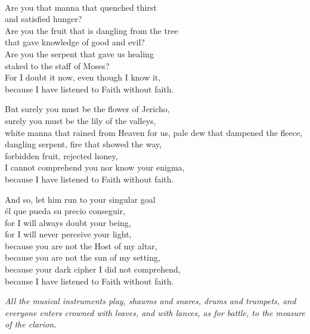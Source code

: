 \begin{poemtranslation}
\begin{translation}
\Dots\\
Are you that manna that quenched thirst\\
and satisfied hunger?\\
Are you the fruit that is dangling from the tree\\
that gave knowledge of good and evil?\\
Are you the serpent that gave us healing\\
staked to the staff of Moses?\\
For I doubt it now, even though I know it,\\
because I have listened to Faith without faith. 

But surely you must be the flower of Jericho,\\
surely you must be the lily of the valleys,\\
white manna that rained from Heaven for us, 
pale dew that dampened the fleece,\\
dangling serpent, fire that showed the way,\\
forbidden fruit, rejected honey,\\
I cannot comprehend you nor know your enigma,\\
because I have listened to Faith without faith. 

And so, let him run to your singular goal\\
él que pueda su precio conseguir,\\
for I will always doubt your being,\\
for I will never perceive your light,\\
because you are not the Host of my altar,\\
because you are not the sun of my setting,\\
because your dark cipher I did not comprehend,\\
because I have listened to Faith without faith. 

\emph{All the musical instruments play, shawms and snares, drums and trumpets,
and everyone enters crowned with leaves, and with lances, as for battle, 
to the measure of the clarion.}
\end{translation}

\end{poemtranslation}
